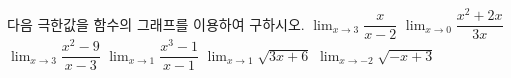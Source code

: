 다음 극한값을 함수의 그래프를 이용하여 구하시오.
 $\displaystyle\lim_{x\to 3}\dfrac{x}{x-2}$
 $\displaystyle\lim_{x\to 0}\dfrac{x^2+2x}{3x}$
 $\displaystyle\lim_{x\to 3}\dfrac{x^2-9}{x-3}$
 $\displaystyle\lim_{x\to 1}\dfrac{x^3-1}{x-1}$
 $\displaystyle\lim_{x\to 1}\sqrt{3x+6}$
 $\displaystyle\lim_{x\to -2}\sqrt{-x+3}$
